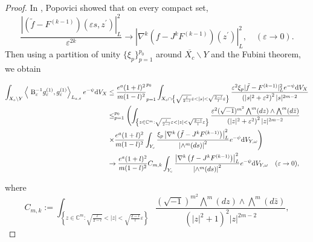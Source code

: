\documentclass[lang=en,12pt,twoside]{textbook}
\let\sum\relax
\begin{document}
\begin{proof}
In \cite[p17]{Popovici2004L2EF}, Popovici showed that on every compact set, 
\[
\frac{\left|\left(\tilde{f}-F^{(k-1)}\right)\left(\varepsilon s, z^{\prime}\right)\right|_L ^2}{\varepsilon^{2 k}} \longrightarrow  \left|\nabla^k\left(f-J^k F^{(k-1)}\right)\left(z^{\prime}\right)\right|_L^2 ,\quad (\varepsilon\to 0).
\]
Then using a partition of unity $\{\xi_p\}_{p=1}^{p_0}$  around $\overline{X_c} \backslash Y$ and the Fubini theorem, we obtain
\begin{fulleq}
 \begin{align*}
      \int_{X_c \backslash Y}\left\langle\mathrm{~B}_{\varepsilon}^{-1} g_{\varepsilon}^{(1)}, g_{\varepsilon}^{(1)}\right\rangle_{L_{a, \varepsilon}} e^{-\psi}\dd V_X 
     & \leq \frac{e^a(1+l)^2}{m(1-l)^2} \sum_{p=1}^{p_0} \int_{X_c \cap\left\{\sqrt{\frac{l}{2-l}} \varepsilon<|s|<\sqrt{\frac{2-l}{l}} \varepsilon\right\}} \frac{\varepsilon^2 \xi_p |\tilde{f}-F^{(k-1)} |^2_{L} e^{-\psi}\dd V_X}{\left(|s|^2+\varepsilon^2\right)^2|s|^{2 m-2}} \\
     & \leq \sum_{p=1}^{p_0}\left(\int_{\left\{z \in \mathbb{C}^m: \sqrt{\frac{l}{2-l}} \varepsilon<|z|<\sqrt{\frac{2-l}{l}} \varepsilon\right\}} \frac{\varepsilon^2(\sqrt{-1})^{m^2} \bigwedge^m(d z) \wedge \bigwedge^m(d \bar{z})}{\left(|z|^2+\varepsilon^2\right)^2|z|^{2 m-2}}\right. \\
     & \left.\times \frac{e^a(1+l)^2}{m(1-l)^2} \int_{Y_c} \frac{\xi_p \left|\nabla^k \left(\tilde{f}-J^k F^{(k-1)}\right)\right| ^2_{L} }{\left|\wedge^m(d s)\right|^2} e^{-\psi}\dd V_{Y,\omega}\right) \\
 &\rightarrow \frac{e^a(1+l)^2}{m(1-l)^2} C_{m,k}\int_{Y_c} \frac{ \left|\nabla^k \left(f-J^k F^{(k-1)}\right) \right|^2_{L} }{\left|\wedge^m(d s)\right|^2} e^{-\psi}\dd V_{Y,\omega}\quad (\varepsilon\to 0),
 \end{align*}
\end{fulleq}
where 
\begin{equation*}
  C_{m,k}:=\int_{\left\{z \in \mathbb{C}^m: \sqrt{\frac{l}{2-l}} <|z|<\sqrt{\frac{2-l}{l}} \varepsilon\right\}} \frac{(\sqrt{-1})^{m^2} \bigwedge^m(d z) \wedge \bigwedge^m(d \bar{z})}{\left(|z|^2+1\right)^2|z|^{2 m-2}},
\end{equation*}

\end{proof}
\end{document}
